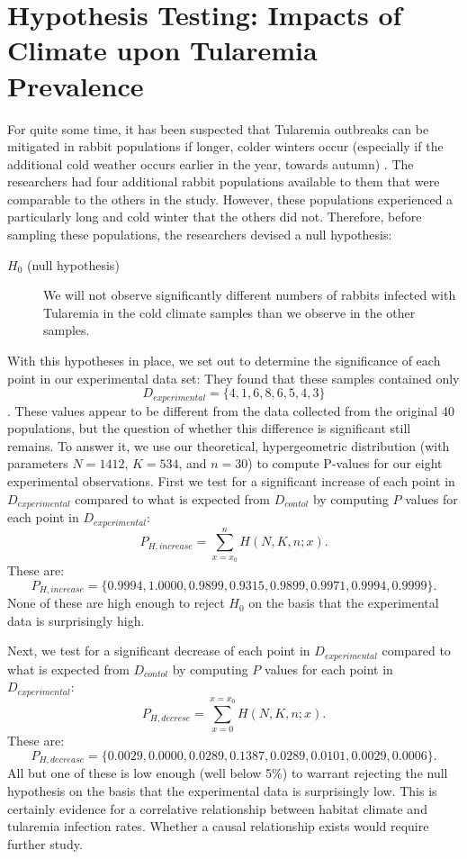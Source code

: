 \documentclass{amsart}
\begin{document}
\section{Hypothesis Testing: Impacts of Climate upon Tularemia Prevalence}
For quite some time, it has been suspected that Tularemia outbreaks can be mitigated in rabbit populations if longer, colder winters occur (especially if the additional cold weather occurs earlier in the year, towards autumn) .  The researchers had four additional rabbit populations available to them that were comparable to the others in the study.  However, these populations experienced a particularly long and cold winter that the others did not.  Therefore, before sampling these populations, the researchers devised a null hypothesis:
\begin{description}
\item[$H_0$ (null hypothesis)] We will not observe significantly different numbers of rabbits infected with Tularemia in the cold climate samples than we observe in the other samples. 
\end{description}
With this hypotheses in place, we set out to determine the significance of each point in our experimental data set:  They found that these samples contained only 
\[D_{experimental}=\{4, 1, 6, 8, 6, 5, 4, 3\}\].
These values appear to be different from the data collected from the original 40 populations, but the question of whether this difference is significant still remains.  To answer it, we use our theoretical, hypergeometric distribution (with parameters $N=1412$, $K=534$, and $n=30$) to compute P-values for our eight experimental observations. First we test for a significant increase of each point in $D_{experimental}$ compared to what is expected from $D_{contol}$ by computing $P$ values for each point in $D_{experimental}$:
\[
P_{H,increase}=\sum_{x=x_0}^n H(N,K,n;x).
\]  These are:
\[
P_{H,increase}=\{0.9994, 1.0000, 0.9899, 0.9315, 0.9899, 0.9971, 0.9994, 0.9999\}.
\]
None of these are high enough to reject $H_0$ on the basis that the experimental data is surprisingly high.

Next, we test for a significant decrease of each point in $D_{experimental}$ compared to what is expected from $D_{contol}$ by computing $P$ values for each point in $D_{experimental}$:
\[
P_{H,decrese}=\sum_{x=0}^{x=x_0}H(N,K,n;x).
\]  These are:
\[
P_{H,decrease}=\{0.0029, 0.0000, 0.0289, 0.1387, 0.0289, 0.0101, 0.0029, 0.0006\}.
\]
All but one of these is low enough (well below 5\%) to warrant rejecting the null hypothesis on the basis that the experimental data is surprisingly low. This is certainly evidence for a correlative relationship between habitat climate and tularemia infection rates. Whether a causal relationship exists would require further study.
\end{document}

